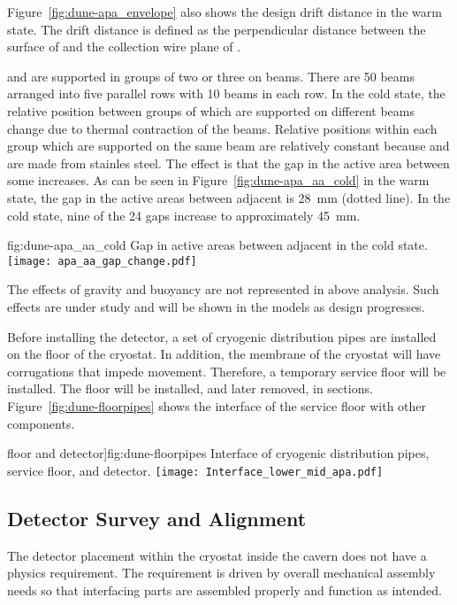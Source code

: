 Figure~\ref{fig:dune-apa_envelope} also shows the design drift distance in
the warm state. The drift distance is defined as the perpendicular
distance between the surface of  and the collection wire
plane of .

 and  are supported in groups of two or three
on  beams. There are 50 beams arranged into five parallel
rows with 10 beams in each row.  In the cold state, the relative
position between groups of  which are supported on
different beams change due to thermal contraction of the
beams. Relative positions within each group which are supported on the
same beam are relatively constant because  and
 are made from stainles steel.  The effect is that the gap
in the active area between some  increases.  As can be
seen in Figure~\ref{fig:dune-apa_aa_cold} in the warm state, the gap
in the active areas between adjacent  is 28~mm (dotted
line). In the cold state, nine of the 24 gaps increase to
approximately 45~mm.
\begin{dunefigure}{fig:dune-apa_aa_cold} 
    {Gap in active areas between adjacent  in the cold state.}
\texttt{[image: apa\_aa\_gap\_change.pdf]}
\end{dunefigure}

The effects of gravity and buoyancy are not represented in above
analysis. Such effects are under study and will be shown in the models
as design progresses.


Before installing the detector, a set of cryogenic distribution pipes
are installed on the floor of the cryostat. In addition, the membrane
of the cryostat will have corrugations that impede
movement. Therefore, a temporary service floor will be installed. The
floor will be installed, and later removed, in
sections. Figure~\ref{fig:dune-floorpipes} shows the interface of the
service floor with other components.
\begin{dunefigure}
  floor and detector]{fig:dune-floorpipes} 
{Interface of cryogenic distribution pipes, service floor, and
  detector.}
\texttt{[image: Interface\_lower\_mid\_apa.pdf]}
\end{dunefigure}

\subsection{Detector Survey and Alignment}
\label{sec:fdsp-coord-integ-survey}
The detector placement within the cryostat inside the
cavern does not have a physics requirement. The requirement is driven
by overall mechanical assembly needs so that interfacing
parts are assembled properly and function as intended.


